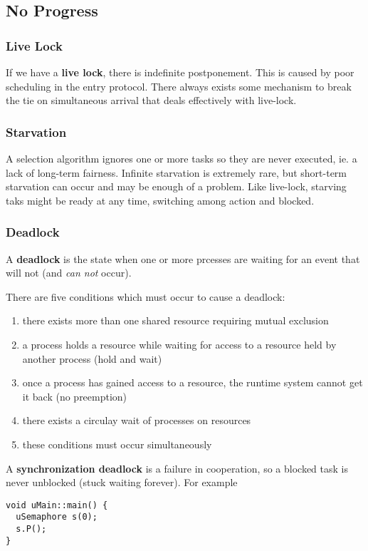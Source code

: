 \documentclass[12pt]{article}
\begin{document}
\subsection{No Progress}
\subsubsection{Live Lock}
If we have a {\bf live lock}, there is indefinite postponement. This is caused by poor scheduling in the entry protocol. There always exists some mechanism to break the tie on simultaneous arrival that deals effectively with live-lock.

\subsubsection{Starvation}
A selection algorithm ignores one or more tasks so they are never executed, ie. a lack of long-term fairness. Infinite starvation is extremely rare, but short-term starvation can occur and may be enough of a problem. Like live-lock, starving taks might be ready at any time, switching among action and blocked.

\subsubsection{Deadlock}
A {\bf deadlock} is the state when one or more prcesses are waiting for an event that will not (and \textit{can not} occur).

There are five conditions which must occur to cause a deadlock:
\begin{enumerate}
\item there exists more than one shared resource requiring mutual exclusion
\item a process holds a resource while waiting for access to a resource held by another process (hold and wait)
\item once a process has gained access to a resource, the runtime system cannot get it back (no preemption)
\item there exists a circulay wait of processes on resources
\item these conditions must occur simultaneously
\end{enumerate}

A {\bf synchronization deadlock} is a failure in cooperation, so a blocked task is never unblocked (stuck waiting forever). For example
\begin{verbatim}
void uMain::main() {
  uSemaphore s(0);
  s.P();
}
\end{verbatim}
\end{document}
